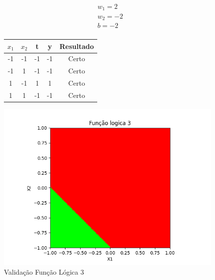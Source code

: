 \begin{figure}[h!]
\centering
\begin{minipage}[c]{0.49\linewidth}
\centering
\[
\begin{aligned}
&w_1 = 2\\
&w_2 = -2\\
&b = -2\\
\end{aligned}
\]
\begin{tabular}{|c|c|c|c|c|}\hline
$x_1$ & $x_2$ & t & y & Resultado\\ \hline
 -1 & -1 & -1 & -1 & Certo\\ \hline
 -1 & 1 & -1 & -1 & Certo\\ \hline
 1 & -1 & 1 & 1 & Certo\\ \hline
 1 & 1 & -1 & -1 & Certo\\ \hline
\end{tabular}
\end{minipage}
\hfill
\begin{minipage}[c]{0.5\linewidth}
\centering
\singlespacing
\includegraphics[width=1.2\textwidth]{im/im3}
\end{minipage}
\caption{Validação Função Lógica 3}
\label{vl3}
\end{figure}

